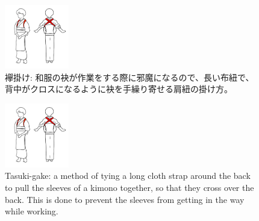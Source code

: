 \documentclass[a4paper,xelatex,ja=standard]{bxjsarticle}
\begin{document}
\ifJPN
  \begin{figure}[htb]\centering\small
    \includegraphics[width=0.25\textwidth]{./figures/tasuki-gake01.png}
    \caption{襷掛け: 和服の袂が作業をする際に邪魔になるので、長い布紐で、背中がクロスになるように袂を手繰り寄せる肩紐の掛け方。}\label{fig:tasuki-gake-picture}
  \end{figure}
\else
  \begin{figure}[htb]\centering\small
    \includegraphics[width=0.25\textwidth]{./figures/tasuki-gake01.png}
    \caption{Tasuki-gake: a method of tying a long cloth strap around the back to pull the sleeves of a kimono together, so that they cross over the back. This is done to prevent the sleeves from getting in the way while working.}\label{fig:tasuki-gake-picture}
  \end{figure}
\fi
\end{document}
